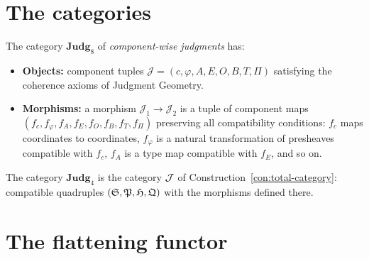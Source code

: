\section{The categories}

\begin{definition}
\label{def:judg8}
The category $\mathbf{Judg}_8$ of \emph{component-wise judgments} has:
\begin{itemize}[nosep]
\item \textbf{Objects:} component tuples
  $\mathcal{J} = (c, \varphi, A, E, O, B, T, \Pi)$ satisfying the
  coherence axioms of Judgment Geometry.
\item \textbf{Morphisms:} a morphism
  $\mathcal{J}_1 \to \mathcal{J}_2$ is a tuple of component maps
  $(f_c, f_\varphi, f_A, f_E, f_O, f_B, f_T, f_\Pi)$ preserving
  all compatibility conditions: $f_c$ maps coordinates to coordinates,
  $f_\varphi$ is a natural transformation of presheaves compatible
  with $f_c$, $f_A$ is a type map compatible with $f_E$, and so on.
\end{itemize}
\end{definition}

\begin{definition}
\label{def:judg4}
The category $\mathbf{Judg}_4$ is the category $\mathcal{J}$ of
Construction~\ref{con:total-category}: compatible quadruples
$(\mathfrak{S}, \mathfrak{P}, \mathfrak{H}, \mathfrak{Q})$ with the morphisms defined there.
\end{definition}

\section{The flattening functor}
\label{sec:forgetful-functor}

